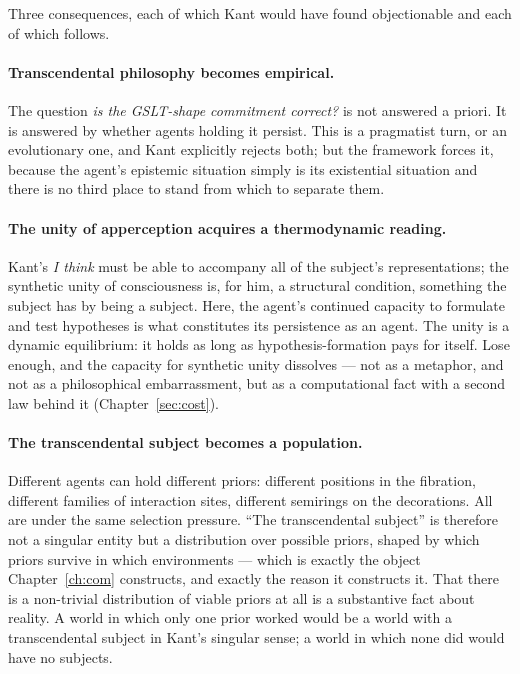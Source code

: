 Three consequences, each of which Kant would have found
objectionable and each of which follows.

\paragraph{Transcendental philosophy becomes empirical.}
The question \emph{is the GSLT-shape commitment correct?} is not
answered a priori.
It is answered by whether agents holding it persist.
This is a pragmatist turn, or an evolutionary one, and Kant
explicitly rejects both; but the framework forces it, because the
agent's epistemic situation simply is its existential situation and
there is no third place to stand from which to separate them.

\paragraph{The unity of apperception acquires a thermodynamic reading.}
Kant's \emph{I think} must be able to accompany all of the
subject's representations; the synthetic unity of consciousness is,
for him, a structural condition, something the subject has by being
a subject.
Here, the agent's continued capacity to formulate and test
hypotheses is what constitutes its persistence as an agent.
The unity is a dynamic equilibrium: it holds as long as
hypothesis-formation pays for itself.
Lose enough, and the capacity for synthetic unity dissolves --- not
as a metaphor, and not as a philosophical embarrassment, but as a
computational fact with a second law behind it
(Chapter~\ref{sec:cost}).

\paragraph{The transcendental subject becomes a population.}
Different agents can hold different priors: different positions in
the fibration, different families of interaction sites, different
semirings on the decorations.
All are under the same selection pressure.
``The transcendental subject'' is therefore not a singular entity
but a distribution over possible priors, shaped by which priors
survive in which environments --- which is exactly the object
Chapter~\ref{ch:com} constructs, and exactly the reason it
constructs it.
That there is a non-trivial distribution of viable priors at all is
a substantive fact about reality.
A world in which only one prior worked would be a world with a
transcendental subject in Kant's singular sense; a world in which
none did would have no subjects.

